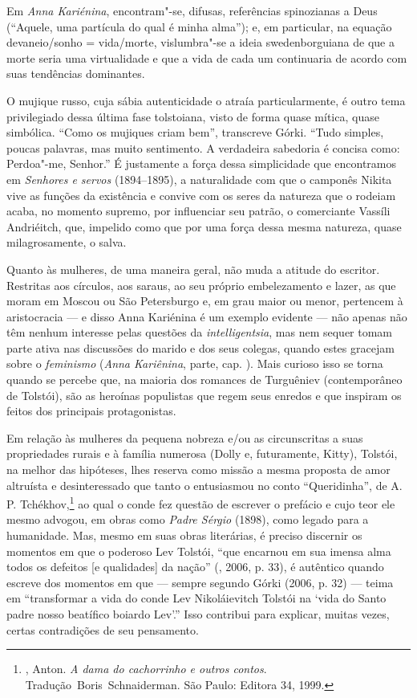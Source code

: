 Em \emph{Anna Kariénina}, encontram"-se, difusas, referências
spinozianas a Deus (``Aquele, uma partícula do qual é minha
alma''); e, em particular, na equação
devaneio/sonho = vida/morte, vislumbra"-se a ideia swedenborguiana
de que a morte seria uma virtualidade e que a vida de cada um
continuaria de acordo com suas tendências dominantes.

O mujique russo, cuja sábia autenticidade o atraía particularmente,
é outro tema privilegiado dessa última fase tolstoiana, visto de
forma quase mítica, quase simbólica. ``Como os mujiques criam bem'',
transcreve Górki. ``Tudo simples, poucas palavras, mas muito
sentimento. A verdadeira sabedoria é concisa como: Perdoa"-me, Senhor.''
É justamente a força dessa simplicidade que encontramos
em \emph{Senhores e servos} (1894--1895), a naturalidade com que o
camponês Nikita vive as funções da existência e convive com os seres da
natureza que o rodeiam acaba, no momento supremo, por influenciar seu
patrão, o comerciante Vassíli Andriéitch, que, impelido como que por uma
força dessa mesma natureza, quase milagrosamente, o salva.

Quanto às mulheres, de uma maneira geral, não muda a atitude do
escritor. Restritas aos círculos, aos saraus, ao seu próprio
embelezamento e lazer, as que moram em Moscou ou São Petersburgo e,
em grau maior ou menor, pertencem à aristocracia --- e disso Anna
Kariénina é um exemplo evidente --- não apenas não têm nenhum
interesse pelas questões da \emph{intelligentsia}, mas nem sequer
tomam parte ativa nas discussões do marido e dos seus colegas,
quando estes gracejam sobre o \emph{feminismo} (\emph{Anna
Kariênina},  parte, cap. ). Mais curioso
isso se torna quando se percebe que, na maioria dos romances de
Turguêniev (contemporâneo de Tolstói), são as heroínas populistas
que regem seus enredos e que inspiram os feitos dos principais
protagonistas.

Em relação às mulheres da pequena nobreza e/ou as circunscritas a
suas propriedades rurais e à família numerosa (Dolly e,
futuramente, Kitty), Tolstói, na melhor das hipóteses, lhes
reserva como missão a mesma proposta de amor altruísta e
desinteressado que tanto o entusiasmou no conto ``Queridinha'',
de A. P. Tchékhov,\footnote{, Anton. \emph{A dama
do cachorrinho e outros contos}. Tradução~Boris~Schnaiderman. São
Paulo: Editora 34, 1999.} ao qual o conde fez questão de escrever
o prefácio e cujo teor ele mesmo advogou, em obras como
\emph{Padre Sérgio} (1898), como legado para a humanidade. Mas, mesmo
em suas obras literárias, é preciso discernir os momentos em que o
poderoso Lev Tolstói, ``que encarnou em sua imensa alma todos os
defeitos [e qualidades] da nação'' (, 2006, p. 33),
é autêntico quando escreve dos momentos em que --- sempre segundo
Górki (2006, p. 32) --- teima em ``transformar a vida do conde Lev
Nikoláievitch Tolstói na ‘vida do Santo padre nosso beatífico boiardo
Lev’.'' Isso contribui para explicar, muitas vezes, certas contradições
de seu pensamento.

